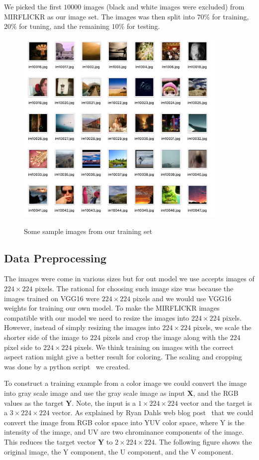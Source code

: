 \documentclass[12pt]{article}
\begin{document}
We picked the first $10000$ images (black and white images were excluded) from MIRFLICKR as our image set. The images was then split into $70\%$ for training, $20\%$ for tuning, and the remaining $10\%$ for testing. 

\begin{figure}[!ht]
 \centering
  \includegraphics[width=4.0in]{resource/exampleimages.png}
 \label{sampleimages}
 \caption{Some sample images from our training set}
\end{figure}



\subsection{Data Preprocessing}
The images were come in various sizes but for out model we use accepts images of $224\times224$ pixels. The rational for choosing such image size was because the images trained on VGG16 were $224\times224$ pixels and we would use VGG16 weights for training our own model. To make the MIRFLICKR images compatible with our model we need to resize the images into $224\times224$ pixels. However, instead of simply resizing the images into $224\times224$ pixels, we scale the shorter side of the image to $224$ pixels and crop the image along with the $224$ pixel side to  $224\times224$ pixels. We think training on images with the correct aspect ration might give a better result for coloring. The scaling and cropping was done by a python script~\cite{PYDATA} we created.

To construct a training example from a color image we could convert the image into gray scale image and use the gray scale image as input $\boldsymbol{X}$, and the RGB values as the target $\boldsymbol{Y}$. Note, the input is a $1\times224\times224$ vector and the target is a $3\times224\times224$ vector. As explained by Ryan Dahl\textquotesingle s web blog post~\cite{RYAN2016} that we could convert the image from RGB color space into YUV color space, where Y is the intensity of the image, and UV are two chrominance components of the image. This reduces the target vector $\boldsymbol{Y}$ to $2\times224\times224$. The following figure shows the original image, the Y component, the U component, and the V component. 
\end{document}

